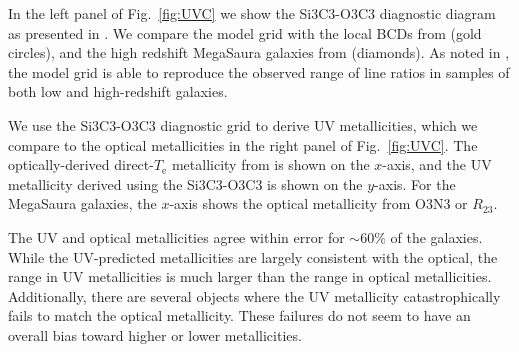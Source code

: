 \documentclass[preprint2]{aastex62}
\newcommand{\mage}{{\sc Meg}a{\sc S}a{\sc ura}\xspace}
\newcommand{\Te}{\ensuremath{T_{\mathrm{e}}}\xspace}
\begin{document}
In the left panel of Fig.~\ref{fig:UVC} we show the Si3C3-O3C3 diagnostic diagram as presented in \citet{Byler+2018}. We compare the model grid with the local BCDs from \citet{Berg+2016} (gold circles), and the high redshift \mage galaxies from \citet{Rigby+2018b} (diamonds). As noted in \citet{Byler+2018}, the model grid is able to reproduce the observed range of line ratios in samples of both low and high-redshift galaxies.

We use the Si3C3-O3C3 diagnostic grid to derive UV metallicities, which we compare to the optical metallicities in the right panel of Fig.~\ref{fig:UVC}. The optically-derived direct-\Te metallicity from \citet{Berg+2016} is shown on the $x$-axis, and the UV metallicity derived using the Si3C3-O3C3 is shown on the $y$-axis. For the \mage galaxies, the $x$-axis shows the optical metallicity from O3N3 or $R_{23}$.

The UV and optical metallicities agree within error for ${\sim}60\%$ of the \citet{Berg+2016} galaxies. While the UV-predicted metallicities are largely consistent with the optical, the range in UV metallicities is much larger than the range in optical metallicities. Additionally, there are several objects where the UV metallicity catastrophically fails to match the optical metallicity. These failures do not seem to have an overall bias toward higher or lower metallicities.
\end{document}
